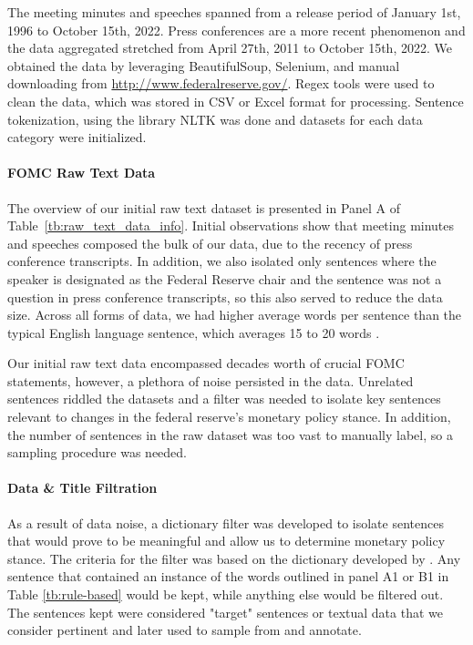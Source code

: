 \documentclass[11pt]{article}
\begin{document}
The meeting minutes and speeches spanned from a release period of January 1st, 1996 to October 15th, 2022. Press conferences are a more recent phenomenon and the data aggregated stretched from April 27th, 2011 to October 15th, 2022. We obtained the data by leveraging BeautifulSoup, Selenium, and manual downloading from \url{http://www.federalreserve.gov/}. Regex tools were used to clean the data, which was stored in CSV or Excel format for processing. Sentence tokenization, using the library NLTK \cite{bird2009natural} was done and datasets for each data category were initialized.

\paragraph{FOMC Raw Text Data} The overview of our initial raw text dataset is presented in Panel A of Table~\ref{tb:raw_text_data_info}.
Initial observations show that meeting minutes and speeches composed the bulk of our data, due to the recency of press conference transcripts. In addition, we also isolated only sentences where the speaker is designated as the Federal Reserve chair and the sentence was not a question in press conference transcripts, so this also served to reduce the data size.
Across all forms of data, we had higher average words per sentence than the typical English language sentence, which averages 15 to 20 words \cite{cutts2020oxford}. 

Our initial raw text data encompassed decades worth of crucial FOMC statements, however, a plethora of noise persisted in the data.
Unrelated sentences riddled the datasets and a filter was needed to isolate key sentences relevant to changes in the federal reserve's monetary policy stance. In addition, the number of sentences in the raw dataset was too vast to manually label, so a sampling procedure was needed.


\paragraph{Data \& Title Filtration}
As a result of data noise, a dictionary filter was developed to isolate sentences that would prove to be meaningful and allow us to determine monetary policy stance. The criteria for the filter was based on the dictionary developed by \citet{gorodnichenko2021voice}. Any sentence that contained an instance of the words outlined in panel A1 or B1 in Table \ref{tb:rule-based}
would be kept, while anything else would be filtered out. The sentences kept were considered "target" sentences or textual data that we consider pertinent and later used to sample from and annotate. 
\end{document}
